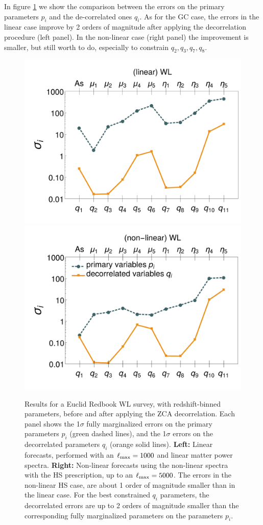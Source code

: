 In figure \ref{fig:WLbinerrs} we show the comparison between the errors on the primary
parameters $p_i$ and the de-correlated ones $q_i$. As for the GC case, the errors in the linear case improve by 2 orders of magnitude after applying the decorrelation procedure (left panel). In the non-linear case (right panel) the improvement is smaller, but still worth to do, especially to constrain $q_2,q_3,q_7,q_8$.

\begin{figure}[htbp]
	\centering{}\begin{center}
		\includegraphics[width=0.47\linewidth]{Chapters/linear-nonlinear-MG-forecasts/figures/Decorrelations-WL/Errors_at_par_index_i--_ZCA_SquareNorm--fiducialMGBin3_Euclid_WL_linearPK_}
		\includegraphics[width=0.47\linewidth]{Chapters/linear-nonlinear-MG-forecasts/figures/Decorrelations-WL/Errors_at_par_index_i--_ZCA_SquareNorm--fiducialMGBin3_Euclid_WL_nonlinearPk__Zhao_}
	\end{center}
	\caption[1$\sigma$ forecasted errors on the primary and decorrelated parameters for Euclid WL.]{\label{fig:WLbinerrs} 
	Results for a Euclid Redbook WL survey, with redshift-binned parameters, 
	before and after applying the ZCA decorrelation.
	Each panel shows the 1$\sigma$ fully marginalized errors on the primary parameters $p_i$ (green dashed
		lines), and the 1$\sigma$ errors on the decorrelated
		parameters $q_i$ (orange solid lines). \textbf{Left: }Linear forecasts,
		performed with an $\ell_{\rm max}=1000$ and linear matter power spectra.
		\textbf{Right: }Non-linear forecasts using the non-linear spectra with the HS prescription, up to an $\ell_{\rm max}=5000$.
		The errors in the non-linear HS case, are about 1 order of magnitude smaller than in the linear case. 
		For the best constrained $q_i$ parameters, the 
		decorrelated errors are up to 2 orders of magnitude smaller than the corresponding fully marginalized parameters on the parameters $p_i$.}
\end{figure}


